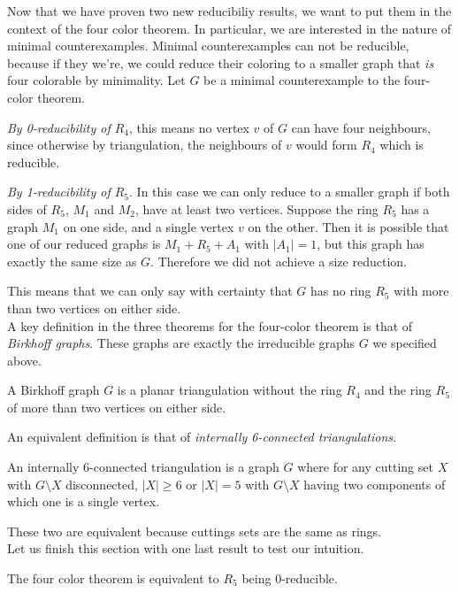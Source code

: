 Now that we have proven two new reducibiliy results, we want to put them in the context of the four color theorem. In particular, we are interested in the nature of minimal counterexamples. Minimal counterexamples can not be reducible, because if they we're, we could reduce their coloring to a smaller graph that \emph{is} four colorable by minimality. Let $G$ be a minimal counterexample to the four-color theorem.

\emph{By 0-reducibility of $R_4$}, this means no vertex $v$ of $G$ can have four neighbours, since otherwise by triangulation, the neighbours of $v$ would form $R_4$ which is reducible.

\emph{By 1-reducibility of $R_5$}. In this case we can only reduce to a smaller graph if both sides of $R_5$, $M_1$ and $M_2$, have at least two vertices. Suppose the ring $R_5$ has a graph $M_1$ on one side, and a single vertex $v$ on the other. Then it is possible that one of our reduced graphs is $M_1 + R_5 + A_1$ with $|A_1|=1$, but this graph has exactly the same size as $G$. Therefore we did not achieve a size reduction. 

This means that we can only say with certainty that $G$ has no ring $R_5$ with more than two vertices on either side.
\\
A key definition in the three theorems for the four-color theorem is that of \emph{Birkhoff graphs}. These graphs are exactly the irreducible graphs $G$ we specified above.

\begin{definition}
    A Birkhoff graph $G$ is a planar triangulation without the ring $R_4$ and the ring $R_5$ of more than two vertices on either side.
\end{definition}

An equivalent definition is that of \emph{internally 6-connected triangulations}.

\begin{definition}
    An internally 6-connected triangulation is a graph $G$ where for any cutting set $X$ with $G\setminus X$ disconnected, $|X| \geq 6$ or $|X|=5$ with $G\setminus X$ having two components of which one is a single vertex.
\end{definition}

These two are equivalent because cuttings sets are the same as rings.
\\
Let us finish this section with one last result to test our intuition.

\begin{theorem}
    The four color theorem is equivalent to $R_5$ being 0-reducible.
\end{theorem}

